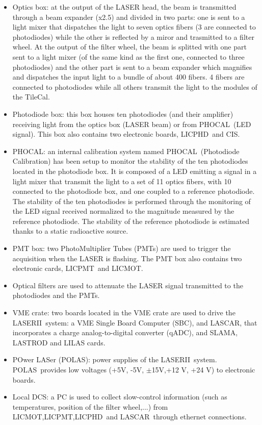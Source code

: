 \documentclass[UKenglish,texlive=2013]{\ATLASLATEXPATH atlasdoc}
\newcommand{\lasii}{{\sc LASERII}}
\newcommand{\phocal}{{\sc PHOCAL}}
\newcommand{\licphd}{{\sc LICPHD}}
\newcommand{\licpmt}{{\sc LICPMT}}
\newcommand{\licmot}{{\sc LICMOT}}
\newcommand{\lascar}{{\sc LASCAR}}
\newcommand{\polas}{{\sc POLAS}}
\newcommand{\charinjsplit}{{\sc CIS}}
\begin{document}
\begin{itemize}
\item Optics box: at the output of the LASER head, the beam is transmitted through a beam expander (x2.5) and divided in two parts: one is sent to a light mixer that dispatches the light to seven optics fibers (3 are connected to photodiodes) while the other is reflected by a miror and trasmitted to a filter wheel. At the output of the filter wheel, the beam is splitted with one part sent to a light mixer (of the same kind as the first one, connected to three photodiodes) and the other part is sent to a beam expander which magnifies and dispatches the input light to a bundle of about 400 fibers. 4 fibers are connected to photodiodes while all others transmit the light to the modules of the TileCal.

\item Photodiode box: this box houses ten photodiodes (and their amplifier) receiving light from the optics box (LASER beam) or from \phocal~(LED signal). This box also contains two electronic boards, \licphd~and \charinjsplit.


\item \phocal: an internal calibration system named \phocal~(Photodiode Calibration) has been setup to monitor the stability of the ten photodiodes located in the photodiode box. It is composed of a LED emitting a signal in a light mixer that transmit the light to a set of 11 optics fibers, with 10 connected to the photodiode box, and one coupled to a reference photodiode. 
The stability of the ten photodiodes is performed through the monitoring of the LED signal received normalized to the magnitude measured by the reference photodiode. The stability of the reference photodiode is estimated thanks to a static radioactive source. 

\item PMT box: two PhotoMultiplier Tubes (PMTs) are used to trigger the acquisition when the LASER is flashing. The PMT box also contains two electronic cards, \licpmt~and \licmot.

\item Optical filters are used to attenuate the LASER signal transmitted to the photodiodes and the PMTs.

\item VME crate: two boards located in the VME crate are used to drive the \lasii~system: a VME Single Board Computer (SBC), and \lascar, that incorporates a charge analog-to-digital converter (qADC), and SLAMA, LASTROD and LILAS cards.

\item POwer LASer (\polas): power supplies of the \lasii~system. \polas~provides low voltages (+5V, -5V, $\pm$15V,+12 V, +24 V) to electronic boards.

\item Local DCS: a PC is used to collect slow-control information (such as temperatures, position of the filter wheel,...) from \licmot,\licpmt,\licphd~and \lascar~through ethernet connections.


\end{itemize}
\end{document}
